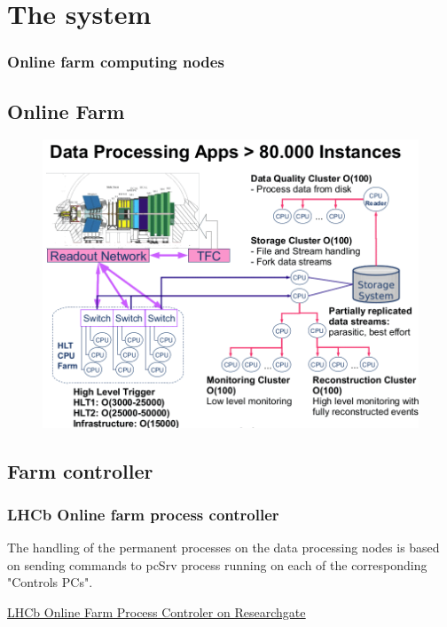 \documentclass{beamer}
\begin{document}
\begin{frame}
\end{frame}

\section{The system}

\begin{frame}
\frametitle{Online farm computing nodes}
\subsection{Online Farm}
\begin{figure}[H]
    	\centering
    	\includegraphics[scale=0.3]{images/Farm.png}
\end{figure}
\end{frame}



\subsection{Farm controller}
\begin{frame}
\frametitle{LHCb Online farm process controller}

The handling of the permanent processes on the data processing nodes is based on sending commands to pcSrv process running on each of the corresponding "Controls PCs".
\newline


\underline{
\href{https://www.researchgate.net/publication/268357086_The_Process_Controller_for_the_LHCb_On-Line_Farm_Prepared_by}{LHCb Online Farm Process Controler on Researchgate}}

\end{frame}
\end{document}
